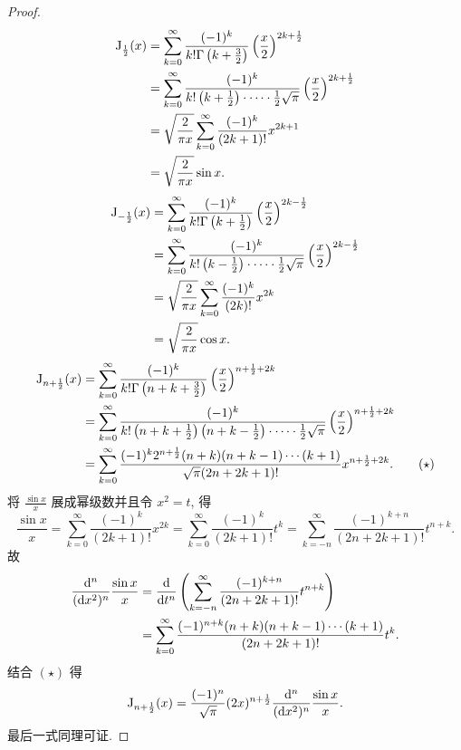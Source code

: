 \begin{proof}
  \begin{align*}
    \mathrm{J}_{\frac{1}{2}}(x)
    & =\sum_{k=0}^{\infty}\frac{(-1)^k}{k!\Gamma\left(k+\frac{3}{2}\right)}\left(\frac{x}{2}\right)^{2k+\frac{1}{2}}\\
    & =\sum_{k=0}^{\infty}\frac{(-1)^k}{k!\left(k+\frac{1}{2}\right)\cdot\cdots\cdot\frac{1}{2}\sqrt{\pi}}\left(\frac{x}{2}\right)^{2k+\frac{1}{2}}\\
    & =\sqrt{\frac{2}{\pi x}}\sum_{k=0}^{\infty}\frac{(-1)^k}{(2k+1)!}x^{2k+1}\\
    & =\sqrt{\frac{2}{\pi x}}\sin x.
  \end{align*}
  \begin{align*}
    \mathrm{J}_{-\frac{1}{2}}(x)
    & = \sum_{k=0}^{\infty}\frac{(-1)^k}{k!\Gamma\left(k+\frac{1}{2}\right)}\left(\frac{x}{2}\right)^{2k-\frac{1}{2}}\\
    & = \sum_{k=0}^{\infty}\frac{(-1)^k}{k!\left(k-\frac{1}{2}\right)\cdot\cdots\cdot\frac{1}{2}\sqrt{\pi}}\left(\frac{x}{2}\right)^{2k-\frac{1}{2}}\\
    & = \sqrt{\frac{2}{\pi x}}\sum_{k=0}^{\infty}\frac{(-1)^k}{(2k)!}x^{2k}\\
    & = \sqrt{\frac{2}{\pi x}}\cos x.
  \end{align*}
  \begin{align}
    \mathrm{J}_{n+\frac{1}{2}}(x)
    & =\sum_{k=0}^{\infty}\frac{(-1)^k}{k!\Gamma\left(n+k+\frac{3}{2}\right)}\left(\frac{x}{2}\right)^{n+\frac{1}{2}+2k} \notag \\
    & =\sum_{k=0}^{\infty}\frac{(-1)^k}{k!\left(n+k+\frac{1}{2}\right)\left(n+k-\frac{1}{2}\right)\cdot\cdots\cdot\frac{1}{2}\sqrt{\pi}}\left(\frac{x}{2}\right)^{n+\frac{1}{2}+2k} \notag \\
    & =\sum_{k=0}^{\infty}\frac{(-1)^k2^{n+\frac{1}{2}}(n+k)(n+k-1)\cdots(k+1)}{\sqrt{\pi}(2n+2k+1)!}x^{n+\frac{1}{2}+2k}. \tag{$\star$}
  \end{align}
  将 $\frac{\sin x}{x}$ 展成幂级数并且令 $x^2=t$, 得
  \[\frac{\sin x}{x}=\sum_{k=0}^{\infty}\frac{(-1)^k}{(2k+1)!}x^{2k}
    = \sum_{k=0}^{\infty}\frac{(-1)^k}{(2k+1)!}t^k
    = \sum_{k=-n}^{\infty}\frac{(-1)^{k+n}}{(2n+2k+1)!}t^{n+k}.\]
  故
  \begin{align*}
    \frac{\mathop{}\!\mathrm{d}^n}{(\mathop{}\!\mathrm{d} x^2)^n}\frac{\sin x}{x}
    & = \frac{\mathop{}\!\mathrm{d}}{\mathop{}\!\mathrm{d} t^n}\left(\sum_{k=-n}^{\infty}\frac{(-1)^{k+n}}{(2n+2k+1)!}t^{n+k}\right) \\
    & = \sum_{k=0}^{\infty}\frac{(-1)^{n+k}(n+k)(n+k-1)\cdots(k+1)}{(2n+2k+1)!}t^k.
  \end{align*}
  结合 $(\star)$ 得
  \[\mathrm{J}_{n+\frac{1}{2}}(x)
    = \frac{(-1)^n}{\sqrt{\pi}}(2x)^{n+\frac{1}{2}}\frac{\mathop{}\!\mathrm{d}^n}{(\mathop{}\!\mathrm{d} x^2)^n}\frac{\sin x}{x}.\]
  最后一式同理可证.
\end{proof}



